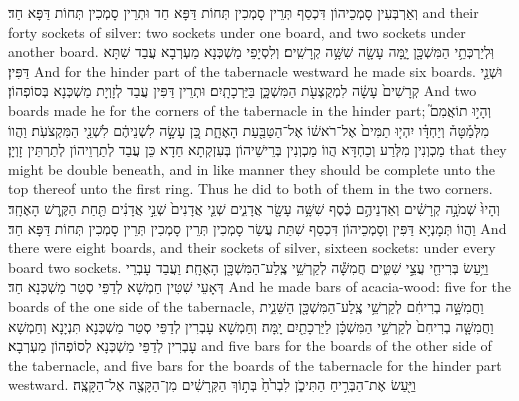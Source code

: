 {{וְאַרְבְּעִין סָמְכֵיהוֹן דִּכְסַף תְּרֵין סָמְכִין תְּחוֹת דַּפָּא חַד וּתְרֵין סָמְכִין תְּחוֹת דַּפָּא חַד׃}
{and their forty sockets of silver: two sockets under one board, and two sockets under another board.}{}
{וּֽלְיַרְכְּתֵ֥י הַמִּשְׁכָּ֖ן יָ֑מָּה עָשָׂ֖ה שִׁשָּׁ֥ה קְרָשִֽׁים׃}
{וְלִסְיָפֵי מַשְׁכְּנָא מַעְרְבָא עֲבַד שִׁתָּא דַּפִּין׃}
{And for the hinder part of the tabernacle westward he made six boards.}{}
{וּשְׁנֵ֤י קְרָשִׁים֙ עָשָׂ֔ה לִמְקֻצְעֹ֖ת הַמִּשְׁכָּ֑ן בַּיַּרְכָתָֽיִם׃}
{וּתְרֵין דַּפִּין עֲבַד לְזָוְיָת מַשְׁכְּנָא בְּסוֹפְהוֹן׃}
{And two boards made he for the corners of the tabernacle in the hinder part;}{}
{וְהָי֣וּ תוֹאֲמִם֮ מִלְּמַ֒טָּה֒ וְיַחְדָּ֗ו יִהְי֤וּ תַמִּים֙ אֶל־רֹאשׁ֔וֹ אֶל־הַטַּבַּ֖עַת הָאֶחָ֑ת כֵּ֚ן עָשָׂ֣ה לִשְׁנֵיהֶ֔ם לִשְׁנֵ֖י הַמִּקְצֹעֹֽת׃}
{וַהֲווֹ מַכְוְנִין מִלְּרַע וְכַחְדָּא הֲווֹ מַכְוְנִין בְּרֵישֵׁיהוֹן בְּעִזְקְתָא חַדָא כֵּן עֲבַד לְתַרְוֵיהוֹן לְתַרְתֵּין זָוְיָן׃}
{that they might be double beneath, and in like manner they should be complete unto the top thereof unto the first ring. Thus he did to both of them in the two corners.}{}
{וְהָיוּ֙ שְׁמֹנָ֣ה קְרָשִׁ֔ים וְאַדְנֵיהֶ֣ם כֶּ֔סֶף שִׁשָּׁ֥ה עָשָׂ֖ר אֲדָנִ֑ים שְׁנֵ֤י אֲדָנִים֙ שְׁנֵ֣י אֲדָנִ֔ים תַּ֖חַת הַקֶּ֥רֶשׁ הָאֶחָֽד׃}
{וַהֲווֹ תְּמָנְיָא דַּפִּין וְסָמְכֵיהוֹן דִּכְסַף שִׁתַּת עֲשַׂר סָמְכִין תְּרֵין סָמְכִין תְּרֵין סָמְכִין תְּחוֹת דַּפָּא חַד׃}
{And there were eight boards, and their sockets of silver, sixteen sockets: under every board two sockets.}{}
{וַיַּ֥עַשׂ בְּרִיחֵ֖י עֲצֵ֣י שִׁטִּ֑ים חֲמִשָּׁ֕ה לְקַרְשֵׁ֥י צֶֽלַע־הַמִּשְׁכָּ֖ן הָאֶחָֽת׃}
{וַעֲבַד עָבְרֵי דְּאָעֵי שִׁטִּין חַמְשָׁא לְדַפֵּי סְטַר מַשְׁכְּנָא חַד׃}
{And he made bars of acacia-wood: five for the boards of the one side of the tabernacle,}{}
{וַחֲמִשָּׁ֣ה בְרִיחִ֔ם לְקַרְשֵׁ֥י צֶֽלַע־הַמִּשְׁכָּ֖ן הַשֵּׁנִ֑ית וַחֲמִשָּׁ֤ה בְרִיחִם֙ לְקַרְשֵׁ֣י הַמִּשְׁכָּ֔ן לַיַּרְכָתַ֖יִם יָֽמָּה׃}
{וְחַמְשָׁא עָבְרִין לְדַפֵּי סְטַר מַשְׁכְּנָא תִּנְיָנָא וְחַמְשָׁא עָבְרִין לְדַפֵּי מַשְׁכְּנָא לְסוֹפְהוֹן מַעְרְבָא׃}
{and five bars for the boards of the other side of the tabernacle, and five bars for the boards of the tabernacle for the hinder part westward.}{}
{וַיַּ֖עַשׂ אֶת־הַבְּרִ֣יחַ הַתִּיכֹ֑ן לִבְרֹ֙חַ֙ בְּת֣וֹךְ הַקְּרָשִׁ֔ים מִן־הַקָּצֶ֖ה אֶל־הַקָּצֶֽה׃}
}
